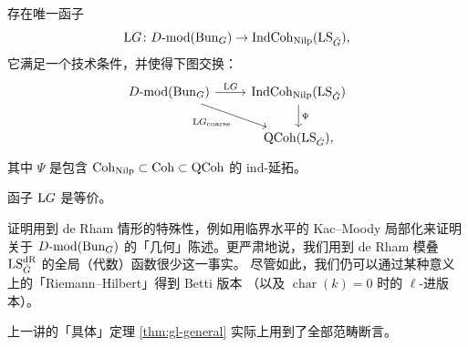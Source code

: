 \begin{theorem}\label{thm:LG}
存在唯一函子
\[
\mathrm{L}G\colon D\text{-}\mathrm{mod}(\operatorname{Bun}_G)\to\operatorname{IndCoh}_{\mathrm{Nilp}}(\mathrm{LS}_{\check{G}}),
\]
它满足一个技术条件，并使得下图交换：
\[
\begin{tikzcd}
\DMod(\Bun_G) \arrow[r,"\LG"] \arrow[dr,"\LG_{\mathrm{coarse}}"'] & \IndCoh_{\mathrm{Nilp}}(\mathrm{LS}_{\Gd}) \arrow[d,"\Psi"] \\
& \QCoh(\mathrm{LS}_{\Gd}),
\end{tikzcd}
\]
其中 \(\Psi\) 是包含 \(\operatorname{Coh}_{\mathrm{Nilp}}\subset\operatorname{Coh}\subset\operatorname{QCoh}\) 的 ind-延拓。
\end{theorem}

\begin{theorem}\label{thm:categorical-ultimate}
函子 \(\mathrm{L}G\) 是等价。
\end{theorem}

\begin{remark}\label{rem:proof}
证明用到 de Rham 情形的特殊性，例如用临界水平的 Kac--Moody 局部化来证明关于
\(D\text{-}\mathrm{mod}(\operatorname{Bun}_G)\) 的「几何」陈述。更严肃地说，我们用到 de Rham 模叠
\(\mathrm{LS}^{\mathrm{dR}}_{\check{G}}\) 的全局（代数）函数很少这一事实。
尽管如此，我们仍可以通过某种意义上的「Riemann--Hilbert」得到 Betti 版本
（以及 \(\operatorname{char}(k)=0\) 时的 \(\ell\)-进版本）。
\end{remark}

\begin{remark}\label{rem:concrete}
上一讲的「具体」定理 \ref{thm:gl-general} 实际上用到了全部范畴断言。
\end{remark}
